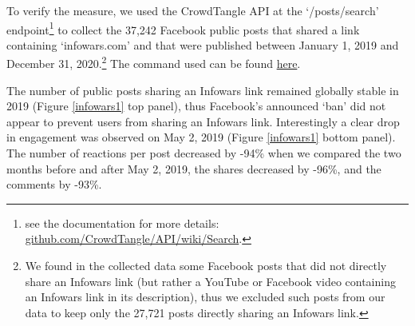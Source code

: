 \documentclass[11pt,a4paper]{article}
\begin{document}
To verify the measure, we used the CrowdTangle API at the ‘/posts/search’ endpoint\footnote{see the documentation for more details: \href{https://github.com/CrowdTangle/API/wiki/Search}{github.com/CrowdTangle/API/wiki/Search}.} to collect the 37,242 Facebook public posts that shared a link containing ‘infowars.com’ and that were published between January 1, 2019 and December 31, 2020.\footnote{We found in the collected data some Facebook posts that did not directly share an Infowars link (but rather a YouTube or Facebook video containing an Infowars link in its description), thus we excluded such posts from our data to keep only the 27,721 posts directly sharing an Infowars link.} The command used can be found \href{https://github.com/medialab/truth-and-trust-online-2021/blob/master/code/collect_facebook_crowdtangle_infowars_data.sh}{here}.

The number of public posts sharing an Infowars link remained globally stable in 2019 (Figure \ref{infowars1} top panel), thus Facebook’s announced ‘ban’ did not appear to prevent users from sharing an Infowars link. Interestingly a clear drop in engagement was observed on May 2, 2019 (Figure \ref{infowars1} bottom panel). The number of reactions per post decreased by -94\% when we compared the two months before and after May 2, 2019, the shares decreased by -96\%, and the comments by -93\%. 
\end{document}
